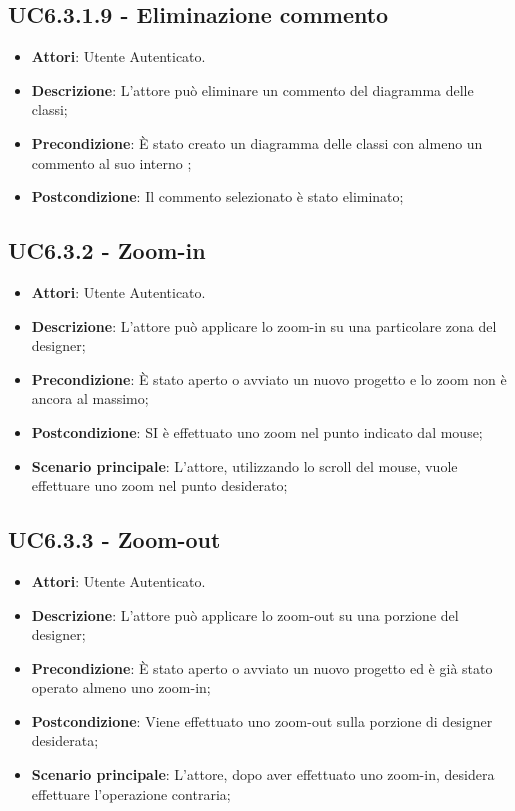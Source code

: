 \subsection{UC6.3.1.9 - Eliminazione commento} 
\label{ssec:UC6.3.1.9} 
\begin{itemize} 
\item \textbf{Attori}: Utente Autenticato.
\item \textbf{Descrizione}: L'attore può eliminare un commento del diagramma delle classi;
\item \textbf{Precondizione}: È stato creato un diagramma delle classi con almeno un commento al suo interno
;
\item \textbf{Postcondizione}: Il commento selezionato è stato eliminato;
\end{itemize} 
\subsection{UC6.3.2 - Zoom-in} 
\label{ssec:UC6.3.2} 
\begin{itemize} 
\item \textbf{Attori}: Utente Autenticato.
\item \textbf{Descrizione}: L'attore può applicare lo zoom-in su una particolare zona del designer;
\item \textbf{Precondizione}: È stato aperto o avviato un nuovo progetto e lo zoom non è ancora al massimo;
\item \textbf{Postcondizione}: SI è effettuato uno zoom nel punto indicato dal mouse;
\item \textbf{Scenario principale}: L'attore, utilizzando lo scroll del mouse, vuole effettuare uno zoom nel punto desiderato;\end{itemize} 
\subsection{UC6.3.3 - Zoom-out} 
\label{ssec:UC6.3.3} 
\begin{itemize} 
\item \textbf{Attori}: Utente Autenticato.
\item \textbf{Descrizione}: L'attore può applicare lo zoom-out su una porzione del designer;
\item \textbf{Precondizione}: È stato aperto o avviato un nuovo progetto ed è già stato operato almeno uno zoom-in;
\item \textbf{Postcondizione}: Viene effettuato uno zoom-out sulla porzione di designer desiderata;
\item \textbf{Scenario principale}: L'attore, dopo aver effettuato uno zoom-in, desidera effettuare l'operazione contraria;\end{itemize} 
